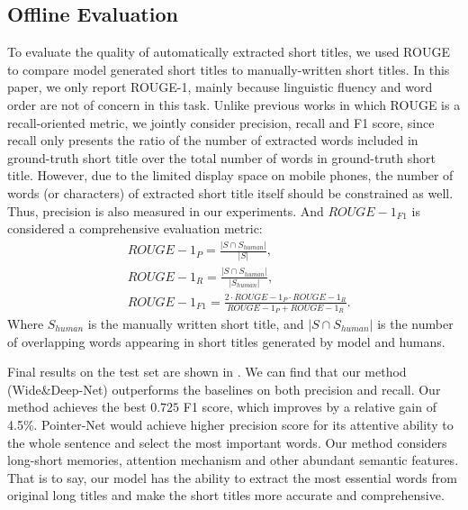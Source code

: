 
\subsection{Offline Evaluation}
\label{sec:eval_offline}
To evaluate the quality of automatically extracted short titles,
we used ROUGE \cite{lin2003automatic} to 
compare model generated
short titles to manually-written short titles.
In this paper, we only report ROUGE-1, mainly because 
linguistic fluency and word order are not of concern in this task.
Unlike previous works in which ROUGE is a recall-oriented metric,
we jointly consider precision, recall and F1 score,
since recall only presents the ratio of 
the number of extracted words included in ground-truth short title
over the total number of words in ground-truth short title.
However, due to the limited display space on mobile phones, 
the number of words (or characters) of extracted short title itself 
should be constrained as well.
Thus, precision is also measured in our experiments.
And $ROUGE-1_{F1}$ is considered a comprehensive 
evaluation metric:
\begin{eqnarray*}
& ROUGE-1_{P}=\frac{|S\cap S_{human}|}{|S|},\\
& ROUGE-1_{R}=\frac{|S\cap S_{human}|}{|S_{human}|},\\
& ROUGE-1_{F1}=\frac{2\cdot ROUGE-1_{P}\cdot ROUGE-1_{R}}{ROUGE-1_{P}+ROUGE-1_{R}}.
\end{eqnarray*}
Where $S_{human}$ is the manually written short title, 
and $|S\cap S_{human}|$ is the number of overlapping words appearing 
in short titles generated by model and humans.

Final results on the test set are shown in .
We can find that our method (Wide\&Deep-Net) outperforms the baselines 
on both precision and recall.
Our method achieves the best $0.725$ F1 score, which improves by a relative gain of 4.5\%.
Pointer-Net would achieve higher precision score 
for its attentive ability to the whole sentence and select the most important words.
Our method considers long-short memories, attention mechanism
and other abundant semantic features.
That is to say, our model has the ability to
extract the most essential words from original long titles
and make the short titles more accurate and comprehensive.

